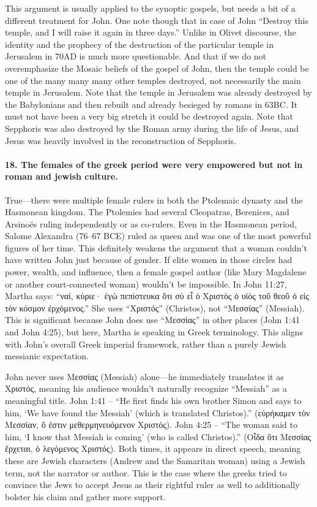 This argument is usually applied to the synoptic gospels, but needs a bit of a different treatment for John.
One note though that in case of John ``Destroy this temple, and I will raise it again in three days.'' Unlike in Olivet discourse, the identity and the prophecy of the destruction of the particular temple in Jerusalem in 70AD is much more questionable.
And that if we do not overemphasize the Mosaic beliefs of the gospel of John, then the temple could be one of the many many many other temples destroyed, not necessarily the main temple in Jerusalem.
Note that the temple in Jerusalem was already destroyed by the Babylonians and then rebuilt and already besieged by romans in 63BC.
It must not have been a very big stretch it could be destroyed again.
Note that Sepphoris was also destroyed by the Roman army during the life of Jesus, and Jesus was heavily involved in the reconstruction of Sepphoris.

\paragraph{18.
The females of the greek period were very empowered but not in roman and jewish culture.}\label{par:the-females-of-the-greek-period-were-very-empowered-but-not-in-roman-and-jewish-culture.}

True---there were multiple female rulers in both the Ptolemaic dynasty and the Hasmonean kingdom.
The Ptolemies had several Cleopatras, Berenices, and Arsinoës ruling independently or as co-rulers.
Even in the Hasmonean period, Salome Alexandra (76--67 BCE) ruled as queen and was one of the most powerful figures of her time.
This definitely weakens the argument that a woman couldn't have written John just because of gender.
If elite women in those circles had power, wealth, and influence, then a female gospel author (like Mary Magdalene or another court-connected woman) wouldn't be impossible.
In John 11:27, Martha says: ``ναί, κύριε· ἐγὼ πεπίστευκα ὅτι σὺ εἶ ὁ Χριστὸς ὁ υἱὸς τοῦ θεοῦ ὁ εἰς τὸν κόσμον ἐρχόμενος.'' She uses ``Χριστός'' (Christos), not ``Μεσσίας'' (Messiah).
This is significant because John does use ``Μεσσίας'' in other places (John 1:41 and John 4:25), but here, Martha is speaking in Greek terminology.
This aligns with John's overall Greek imperial framework, rather than a purely Jewish messianic expectation.

John never uses Μεσσίας (Messiah) alone---he immediately translates it as Χριστός, meaning his audience wouldn't naturally recognize ``Messiah'' as a meaningful title.
John 1:41 -- ``He first finds his own brother Simon and says to him, `We have found the Messiah' (which is translated Christos).'' (εὑρήκαμεν τὸν Μεσσίαν, ὅ ἐστιν μεθερμηνευόμενον Χριστός).
John 4:25 -- ``The woman said to him, `I know that Messiah is coming' (who is called Christos).'' (Οἶδα ὅτι Μεσσίας ἔρχεται, ὁ λεγόμενος Χριστός).
Both times, it appears in direct speech, meaning these are Jewish characters (Andrew and the Samaritan woman) using a Jewish term, not the narrator or author.
This is the case where the greeks tried to convince the Jews to accept Jesus as their rightful ruler as well to additionally bolster his claim and gather more support.

